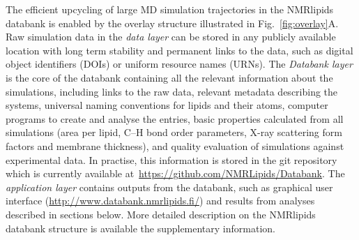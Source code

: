 \documentclass[fleqn,10pt]{wlscirep}
\begin{document}
The efficient upcycling of large MD simulation trajectories in the NMRlipids databank is enabled by the overlay structure illustrated in Fig.~\ref{fig:overlay}A. Raw simulation data in the {\it data layer} can be stored in any publicly available location with long term stability and permanent links to the data, such as digital object identifiers (DOIs) or uniform resource names (URNs). The {\it Databank layer} is the core of the databank containing all the relevant information about the simulations, including links to the raw data, relevant metadata describing the systems, universal naming conventions for lipids and their atoms, computer programs to create and analyse the entries, basic properties calculated from all simulations (area per lipid, C--H bond order parameters, X-ray scattering form factors and membrane thickness), and quality evaluation of simulations against experimental data. In practise, this information is stored in the git repository which is currently available at~\url{https://github.com/NMRLipids/Databank}. The {\it application layer} contains outputs from the databank, such as graphical user interface (\url{http://www.databank.nmrlipids.fi/}) and results from analyses described in sections below. More detailed description on the NMRlipids databank structure is available the supplementary information. 

\end{document}
